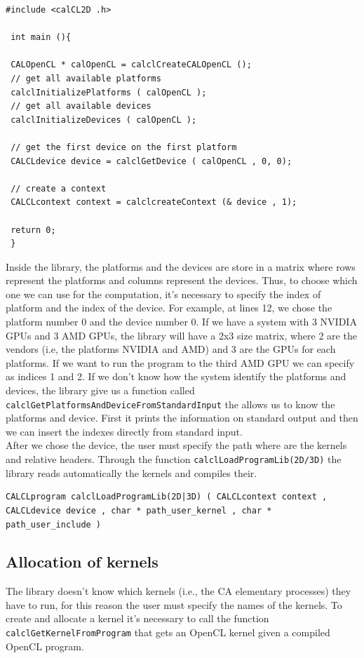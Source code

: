 \begin{lstlisting}
#include <calCL2D .h>

 int main (){

 CALOpenCL * calOpenCL = calclCreateCALOpenCL ();
 // get all available platforms
 calclInitializePlatforms ( calOpenCL );
 // get all available devices
 calclInitializeDevices ( calOpenCL );

 // get the first device on the first platform
 CALCLdevice device = calclGetDevice ( calOpenCL , 0, 0);

 // create a context
 CALCLcontext context = calclcreateContext (& device , 1);

 return 0;
 }
\end{lstlisting}

Inside the library, the platforms and the devices are store in a matrix where rows represent the platforms and columns represent the devices. Thus, to choose which one we can use for the computation,
it's necessary to specify the index of platform and the index of the device. For
example, at lines 12, we chose the platform number
0 and the device number 0. If we have a system with 3 NVIDIA GPUs and 3 AMD GPUs, the library will have a 2x3 size matrix, where 2 are the vendors (i.e, the platforms NVIDIA and AMD) and 3 are the GPUs for each platforms. If we want to 	
run the program to the third AMD GPU we can specify as indices 1 and 2.
If we don't know how the system identify the platforms and devices, the
library give us a function called \verb'calclGetPlatformsAndDeviceFromStandardInput'
the allows us to know the platforms and device. First it prints the
information on standard output and then we can insert the indexes directly from
standard input.\\
After we chose the device, the user must specify the path where are the kernels
and relative headers.
Through the function \verb'calclLoadProgramLib(2D/3D)' the library reads automatically
the kernels and compiles their.
\begin{lstlisting}
CALCLprogram calclLoadProgramLib(2D|3D) ( CALCLcontext context ,
CALCLdevice device , char * path_user_kernel , char *
path_user_include )
\end{lstlisting}

\subsection{Allocation of kernels}

The library doesn't know which kernels (i.e., the CA elementary processes) they have to run, for this reason the
user must specify the names of the kernels.
To create and allocate a kernel it's necessary to call the function
\verb'calclGetKernelFromProgram' that gets an OpenCL kernel given a compiled OpenCL
program. 

